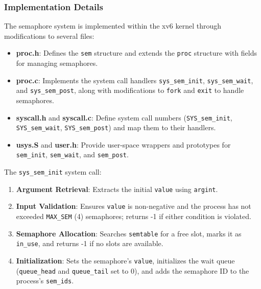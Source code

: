 \documentclass[12pt]{article}
\begin{document}
\subsubsection{Implementation Details}
\label{subsubsec:semaphore-implementation-details}

The semaphore system is implemented within the xv6 kernel through modifications to several files:

\begin{itemize}
  \item \textbf{proc.h}: Defines the \texttt{sem} structure and extends the \texttt{proc} structure with fields for managing semaphores.
  \item \textbf{proc.c}: Implements the system call handlers \texttt{sys\_sem\_init}, \texttt{sys\_sem\_wait}, and \texttt{sys\_sem\_post}, along with modifications to \texttt{fork} and \texttt{exit} to handle semaphores.
  \item \textbf{syscall.h} and \textbf{syscall.c}: Define system call numbers (\texttt{SYS\_sem\_init}, \texttt{SYS\_sem\_wait}, \texttt{SYS\_sem\_post}) and map them to their handlers.
  \item \textbf{usys.S} and \textbf{user.h}: Provide user-space wrappers and prototypes for \texttt{sem\_init}, \texttt{sem\_wait}, and \texttt{sem\_post}.
\end{itemize}

The \texttt{sys\_sem\_init} system call:
\begin{enumerate}
  \item \textbf{Argument Retrieval}: Extracts the initial \texttt{value} using \texttt{argint}.
  \item \textbf{Input Validation}: Ensures \texttt{value} is non-negative and the process has not exceeded \texttt{MAX\_SEM} (4) semaphores; returns -1 if either condition is violated.
  \item \textbf{Semaphore Allocation}: Searches \texttt{semtable} for a free slot, marks it as \texttt{in\_use}, and returns -1 if no slots are available.
  \item \textbf{Initialization}: Sets the semaphore’s \texttt{value}, initializes the wait queue (\texttt{queue\_head} and \texttt{queue\_tail} set to 0), and adds the semaphore ID to the process’s \texttt{sem\_ids}.
\end{enumerate}
\end{document}
